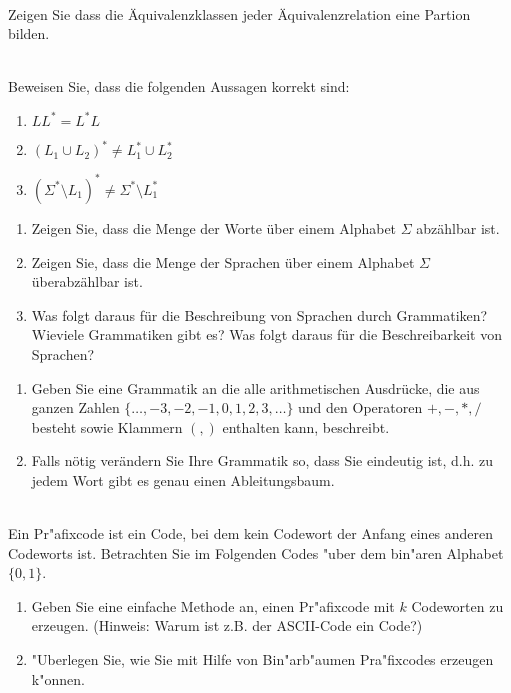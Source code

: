 \documentclass[a4paper]{article}
\begin{document}
\\
Zeigen Sie dass die \"Aquivalenzklassen jeder \"Aquivalenzrelation eine Partion bilden.


\newpage

\\
Beweisen Sie, dass die folgenden Aussagen korrekt sind:
\begin{enumerate}
\item $LL^*=L^*L$
\item $(L_1\cup L_2)^*\neq L_1^*\cup L_2^*$
\item $\left(\Sigma^*\setminus L_1\right)^*\neq \Sigma^*\setminus L_1^*$
\end{enumerate}

\bigskip


\begin{enumerate}
\item Zeigen Sie, dass die Menge der Worte \"uber einem Alphabet $\Sigma$ abz\"ahlbar ist.
\item Zeigen Sie, dass die Menge der Sprachen \"uber einem Alphabet $\Sigma$ \"uberabz\"ahlbar ist.
\item Was folgt daraus f\"ur die Beschreibung von Sprachen durch Grammatiken?\\
Wieviele Grammatiken gibt es? Was folgt daraus f\"ur die Beschreibarkeit von Sprachen?
\end{enumerate}

\bigskip

\begin{enumerate}
\item Geben Sie eine Grammatik an die alle arithmetischen Ausdr\"ucke, die aus ganzen Zahlen $\{\dots,-3,-2,-1,0,1,2,3,\dots\}$ und den Operatoren $+,-,
*,/$ besteht sowie Klammern $(,)$ enthalten kann, beschreibt.
\item Falls n\"otig ver\"andern Sie Ihre Grammatik so, dass Sie eindeutig ist, d.h. zu jedem Wort gibt es genau einen Ableitungsbaum.
\end{enumerate}

\bigskip

\\
Ein Pr"afixcode ist ein Code, bei dem kein Codewort der Anfang eines anderen Codeworts ist. Betrachten Sie im Folgenden Codes "uber dem bin"aren Alphabet $\{0,1\}$.
\begin{enumerate}
\item Geben Sie eine einfache Methode an, einen Pr"afixcode mit $k$ Codeworten zu erzeugen. (Hinweis: Warum ist z.B. der ASCII-Code ein Code?)
\item "Uberlegen Sie, wie Sie mit Hilfe von Bin"arb"aumen Pra"fixcodes erzeugen k"onnen.
\end{enumerate}

\bigskip
\end{document}
